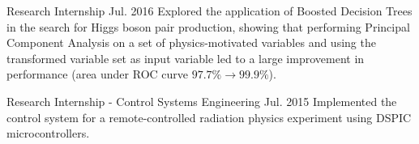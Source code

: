 \begin{cventries}
    {Research Internship}
    {}
    {Jul. 2016}
    {Explored the application of Boosted Decision Trees in the search for Higgs boson pair production, showing that performing Principal Component Analysis on a set of physics-motivated variables and using the transformed variable set as input variable led to a large improvement in performance (area under ROC curve $97.7\% \to 99.9\%$).}

    {Research Internship - Control Systems Engineering}
    {}
    {Jul. 2015}
    {Implemented the control system for a remote-controlled radiation physics experiment using DSPIC microcontrollers.}

\end{cventries}